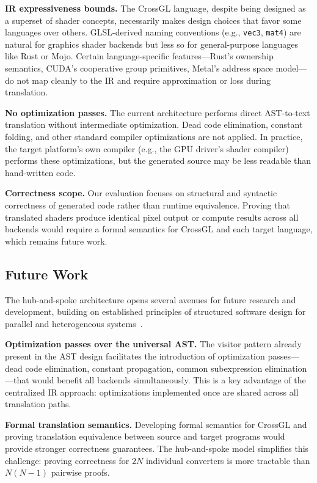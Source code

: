 \documentclass{svproc}
\begin{document}
\textbf{IR expressiveness bounds.} The CrossGL language, despite being designed as a superset of shader concepts, necessarily makes design choices that favor some languages over others. GLSL-derived naming conventions (e.g., \texttt{vec3}, \texttt{mat4}) are natural for graphics shader backends but less so for general-purpose languages like Rust or Mojo. Certain language-specific features---Rust's ownership semantics, CUDA's cooperative group primitives, Metal's address space model---do not map cleanly to the IR and require approximation or loss during translation.

\textbf{No optimization passes.} The current architecture performs direct AST-to-text translation without intermediate optimization. Dead code elimination, constant folding, and other standard compiler optimizations are not applied. In practice, the target platform's own compiler (e.g., the GPU driver's shader compiler) performs these optimizations, but the generated source may be less readable than hand-written code.

\textbf{Correctness scope.} Our evaluation focuses on structural and syntactic correctness of generated code rather than runtime equivalence. Proving that translated shaders produce identical pixel output or compute results across all backends would require a formal semantics for CrossGL and each target language, which remains future work.

\subsection{Future Work}

The hub-and-spoke architecture opens several avenues for future research and development, building on established principles of structured software design for parallel and heterogeneous systems~\cite{mccool2012structured}.

\textbf{Optimization passes over the universal AST.} The visitor pattern already present in the AST design facilitates the introduction of optimization passes---dead code elimination, constant propagation, common subexpression elimination---that would benefit all backends simultaneously. This is a key advantage of the centralized IR approach: optimizations implemented once are shared across all translation paths.

\textbf{Formal translation semantics.} Developing formal semantics for CrossGL and proving translation equivalence between source and target programs would provide stronger correctness guarantees. The hub-and-spoke model simplifies this challenge: proving correctness for $2N$ individual converters is more tractable than $N(N-1)$ pairwise proofs.
\end{document}
